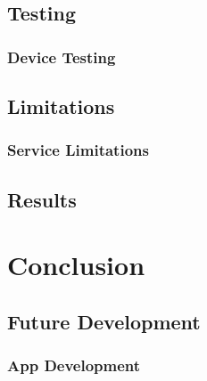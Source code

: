 \section{Testing}
\subsection{Device Testing}

\section{Limitations}
\subsection{Service Limitations}

\section{Results}

\chapter{Conclusion}
\section{Future Development}
\subsection{App Development}

